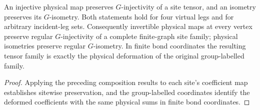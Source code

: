 \begin{lemma}%
    \label{thm:peps_g_injective_physical_site_family}
    \leanok
    An injective physical map preserves $G$-injectivity of a site
    tensor, and an isometry preserves its $G$-isometry.
    Both statements hold for four virtual legs and for arbitrary
    incident-leg sets.
    Consequently invertible physical maps at every vertex preserve
    regular $G$-injectivity of a complete finite-graph site family;
    physical isometries preserve regular $G$-isometry.
    In finite bond coordinates the resulting tensor family is exactly
    the physical deformation of the original group-labelled family.
\end{lemma}

\begin{proof}\leanok
    Applying the preceding composition results to each site's coefficient
    map establishes sitewise preservation, and the group-labelled coordinates
    identify the deformed coefficients with the same physical sums in finite
    bond coordinates.
\end{proof}
